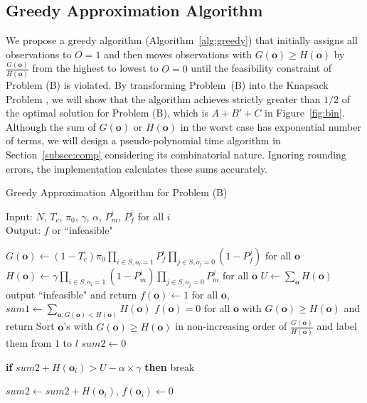 \documentclass[conference]{IEEEtran}
\begin{document}
\subsection{Greedy Approximation Algorithm}
\label{subsec:greedy}



We propose a greedy algorithm (Algorithm~\ref{alg:greedy}) that initially assigns all observations to $O=1$ and then moves observations with $G(\boldsymbol{o})\ge H(\boldsymbol{o})$ by $\frac{G(\boldsymbol{o})}{H(\boldsymbol{o})}$ from the highest to lowest to $O=0$ until the feasibility constraint of Problem (B) is violated. By transforming Problem~(B) into the Knapsack Problem \cite{Vijay}, we will show that the algorithm achieves strictly greater than $1/2$ of the optimal solution for Problem (B), which is $A+B'+C$ in Figure~\ref{fig:bin}. Although the sum of $G(\boldsymbol{o})$ or $H(\boldsymbol{o})$ in the worst case has exponential number of terms, we will design a pseudo-polynomial time algorithm in Section~\ref{subsec:comp} considering its combinatorial nature. Ignoring rounding errors, the implementation calculates these sums accurately.

\begin{algorithm}[t]
    \caption{{\footnotesize Greedy Approximation Algorithm for Problem (B)}}\label{alg:greedy}
    {\scriptsize Input: $N$, $T_c$, ${\pi}_0$, $\gamma$, $\alpha$, $P_m^i$, $P_f^i$ for all $i$ \\Output: $f$ or ``infeasible"}
    \begin{algorithmic}[1]
    {\footnotesize \STATE $G(\boldsymbol{o})\leftarrow (1-T_c){\pi}_0 \prod\limits_{i\in S,o_i=1}{P_f^i}\prod\limits_{j\in S,o_j=0}{(1-P_f^j)}$ for all $\boldsymbol{o}$
	\STATE $H(\boldsymbol{o})\leftarrow \gamma \prod\limits_{i\in S,o_i=1}{(1-P_m^i)}\prod\limits_{j\in S,o_j=0}{P_m^j}$ for all $\boldsymbol{o}$
	\STATE $U\leftarrow \sum\limits_{\boldsymbol{o}}{H(\boldsymbol{o})}$
	\STATE output ``infeasible" and return
    \ENDIF
    \STATE $f(\boldsymbol{o})\leftarrow 1$ for all $\boldsymbol{o}$, $sum1 \leftarrow \sum\limits_{\boldsymbol{o}:G(\boldsymbol{o})<H(\boldsymbol{o})}{H(\boldsymbol{o})}$
		\STATE $f(\boldsymbol{o})=0$ for all $\boldsymbol{o}$ with $G(\boldsymbol{o})\ge H(\boldsymbol{o})$ and return
    \ENDIF
    \STATE Sort $\boldsymbol{o}$'s with $G(\boldsymbol{o})\ge H(\boldsymbol{o})$ in non-increasing order of $\frac{G(\boldsymbol{o})}{H(\boldsymbol{o})}$ and label them from $1$ to $l$
    \STATE $sum2\leftarrow 0$

\STATE \textbf{if} $sum2 +H(\boldsymbol{o}_i)> U-\alpha\times \gamma$ \textbf{then} break

		\STATE $sum2\leftarrow sum2+H(\boldsymbol{o}_i)$, $f(\boldsymbol{o}_i)\leftarrow 0$

    \ENDFOR}

    \end{algorithmic}
\end{algorithm}
\end{document}

